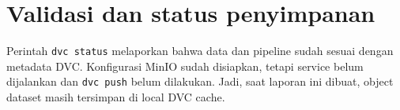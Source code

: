 \documentclass[11pt,a4paper]{article}
\begin{document}
\section*{Validasi dan status penyimpanan}
Perintah \texttt{dvc status} melaporkan bahwa data dan pipeline sudah sesuai
dengan metadata DVC. Konfigurasi MinIO sudah disiapkan, tetapi service belum
dijalankan dan \texttt{dvc push} belum dilakukan. Jadi, saat laporan ini dibuat,
object dataset masih tersimpan di local DVC cache.
\end{document}
